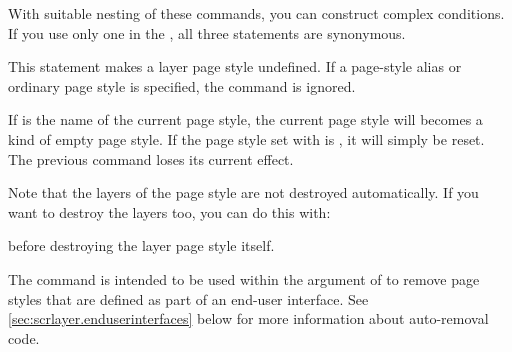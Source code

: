 With suitable nesting of these commands, you can construct complex conditions.
If you use only one  in the , all three
statements are synonymous.%
\EndIndexGroup


\begin{Declaration}
\end{Declaration}
%
%
\iftrue
This statement makes a layer page style undefined. If a page-style alias or
ordinary page style is specified, the command is ignored.
\else
With this command you can remove a the definition of a layer page style.
However, this only occurs if a layer page style named \PName{page style name}
exists. If, instead, it is a page-style alias, a different (non-layer) page
style, or not a page style at all, nothing happens; the command is ignored.%
\fi

If  is the name of the current page style, the current
page style will becomes a kind of empty page style. If the page style set with
 is , it will simply
be reset. The previous  command loses its
current effect.

Note that the layers of the page style are not destroyed
automatically. If you want to destroy the layers too, you can do this with: 
\begin{lstcode}
\end{lstcode}
before destroying the layer page style itself.

The command is intended to be used within the  argument of
 to remove page styles
that are defined as part of an end-user interface. See
\autoref{sec:scrlayer.enduserinterfaces} below for more information about
auto-removal code.%
\EndIndexGroup
\EndIndexGroup



